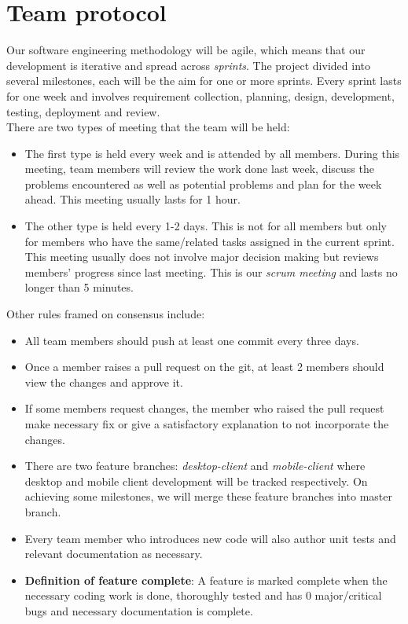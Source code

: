 \section{Team protocol}

Our software engineering methodology will be agile, which means that our development is iterative and spread across \emph{sprints}. The project divided into several milestones, each will be the aim for one or more sprints. Every sprint lasts for one week and involves requirement collection, planning, design, development, testing, deployment and review.\\

There are two types of meeting that the team will be held:

\begin{itemize}

\item The first type is held every week and is attended by all members. During this meeting, team members will review the work done last week, discuss the problems encountered as well as potential problems and plan for the week ahead. This meeting usually lasts for 1 hour.

\item The other type is held every 1-2 days. This is not for all members but only for members who have the same/related tasks assigned in the current sprint. This meeting usually does not involve major decision making but reviews members' progress since last meeting. This is our \emph{scrum meeting} and lasts no longer than 5 minutes.

\end{itemize}

Other rules framed on consensus include:

\begin{itemize}

\item All team members should push at least one commit every three days.

\item Once a member raises a pull request on the git, at least 2 members should view the changes and approve it.

\item If some members request changes, the member who raised the pull request make necessary fix or give a satisfactory explanation to not incorporate the changes.

\item There are two feature branches: \emph{desktop-client} and \emph{mobile-client} where desktop and mobile client development will be tracked respectively. On achieving some milestones, we will merge these feature branches into master branch.

\item Every team member who introduces new code will also author unit tests and relevant documentation as necessary.

\item \textbf{Definition of feature complete}: A feature is marked complete when the necessary coding work is done, thoroughly tested and has 0 major/critical bugs and necessary documentation is complete.

\end{itemize}
